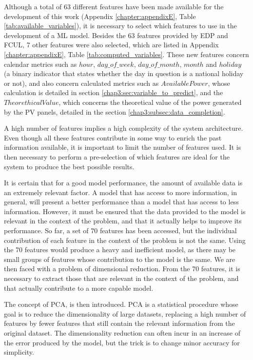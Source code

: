 Although a total of 63 different features have been made available for the development of this work (Appendix \ref{chapter:appendixE}, Table \ref{tab:available_variables}), it is necessary to select which features to use in the development of a \ac{ML} model. Besides the 63 features provided by \ac{EDP} and \ac{FCUL}, 7 other features were also selected, which are listed in Appendix \ref{chapter:appendixE}, Table \ref{tab:computed_variables}. These new features concern calendar metrics such as $hour$, $day\_of\_week$, $day\_of\_month$, $month$ and $holiday$ (a binary indicator that states whether the day in question is a national holiday or not), and also concern calculated metrics such as $AvailablePower$, whose calculation is detailed in section \ref{chap3:sec:variable_to_predict}, and the $TheorethicalValue$, which concerns the theoretical value of the power generated by the \ac{PV} panels, detailed in the section \ref{chap3:subsec:data_completion}. 

A high number of features implies a high complexity of the system architecture. Even though all these features contribute in some way to enrich the past information available, it is important to limit the number of features used. It is then necessary to perform a pre-selection of which features are ideal for the system to produce the best possible results. 

It is certain that for a good model performance, the amount of available data is an extremely relevant factor. A model that has access to more information, in general, will present a better performance than a model that has access to less information. However, it must be ensured that the data provided to the model is relevant in the context of the problem, and that it actually helps to improve its performance. So far, a set of 70 features has been accessed, but the individual contribution of each feature in the context of the problem is not the same. Using the 70 features would produce a heavy and inefficient model, as there may be small groups of features whose contribution to the model is the same. We are then faced with a problem of dimensional reduction. From the 70 features, it is necessary to extract those that are relevant in the context of the problem, and that actually contribute to a more capable model.

The concept of \ac{PCA}, \cite{pca} is then introduced. \ac{PCA} is a statistical procedure whose goal is to reduce the dimensionality of large datasets, replacing a high number of features by fewer features that still contain the relevant information from the original dataset. The dimensionality reduction can often incur in an increase of the error produced by the model, but the trick is to change minor accuracy for simplicity.


